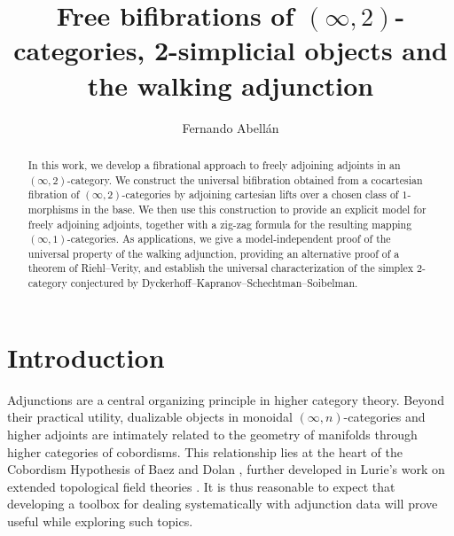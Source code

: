 \documentclass[a4paper,reqno,twoside]{amsart}
\begin{document}
\title{Free bifibrations of $(\infty,2)$-categories, 2-simplicial objects and the walking adjunction}

\author{Fernando Abellán}
\address{Max Planck Institute for Mathematics, Vivatsgasse 7, 53111 Bonn, Germany}




\begin{abstract}
	In this work, we develop a fibrational approach to freely adjoining adjoints in an $(\infty,2)$-category. We construct the universal bifibration obtained from a cocartesian fibration of $(\infty,2)$-categories by adjoining cartesian lifts over a chosen class of $1$-morphisms in the base. We then use this construction to provide an explicit model for freely adjoining adjoints, together with a zig-zag formula for the resulting mapping $(\infty,1)$-categories. As applications, we give a model-independent proof of the universal property of the walking adjunction, providing an alternative proof of a theorem of Riehl--Verity, and establish the universal characterization of the simplex $2$-category conjectured by Dyckerhoff--Kapranov--Schechtman--Soibelman.
\end{abstract}

\maketitle
\thispagestyle{empty}
\pagestyle{headings}







\tableofcontents

\newpage
\section{Introduction}
Adjunctions are a central organizing principle in higher category theory. Beyond their practical utility, dualizable objects in monoidal $(\infty,n)$-categories and higher adjoints are intimately related to the geometry of manifolds through higher categories of cobordisms. This relationship lies at the heart of the Cobordism Hypothesis of Baez and Dolan \cite{BaezDolan1995HigherDimensionalAlgebra}, further developed in Lurie's work on extended topological field theories \cite{Lurie2009ClassificationTFT}. It is thus reasonable to expect that developing a toolbox for dealing systematically with adjunction data will prove useful while exploring such topics.
\end{document}
